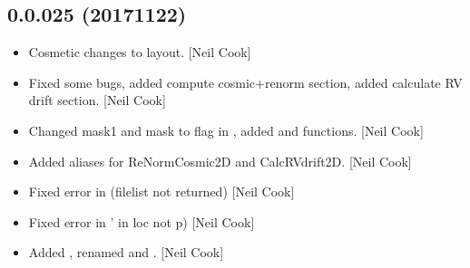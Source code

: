 \documentclass[a4paper,10pt,english]{report}
\begin{document}
\subsection{0.0.025 (2017\sphinxhyphen{}11\sphinxhyphen{}22)}
\label{\detokenize{misc/changelog:id545}}\begin{itemize}
\item {} 
Cosmetic changes to layout. {[}Neil Cook{]}

\item {} 
Fixed some bugs, added compute cosmic+renorm section, added calculate
RV drift section. {[}Neil Cook{]}

\item {} 
Changed mask1 and mask to flag in , added
 and  functions. {[}Neil Cook{]}

\item {} 
Added aliases for ReNormCosmic2D and CalcRVdrift2D. {[}Neil Cook{]}

\item {} 
Fixed error in  (filelist not returned) {[}Neil
Cook{]}

\item {} 
Fixed error in  ’ in loc
not p) {[}Neil Cook{]}

\item {} 
Added , renamed  and . {[}Neil
Cook{]}

\end{itemize}
\end{document}
